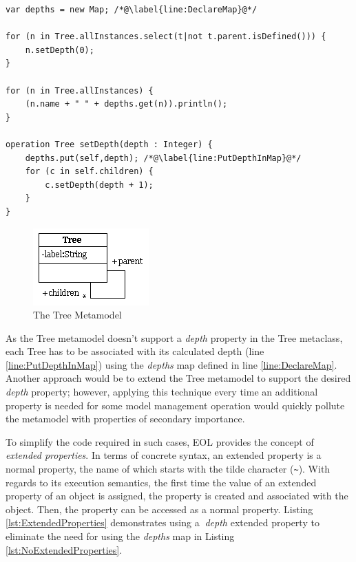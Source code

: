 \begin{lstlisting}[basicstyle=\ttfamily\footnotesize, flexiblecolumns=true, numbers=none, nolol=true, caption=Calculating and printing the depth of each Tree, label=lst:NoExtendedProperties, numbers=left, language=EOL, tabsize=2]
var depths = new Map; /*@\label{line:DeclareMap}@*/

for (n in Tree.allInstances.select(t|not t.parent.isDefined())) {
	n.setDepth(0);
}

for (n in Tree.allInstances) {
	(n.name + " " + depths.get(n)).println();
}

operation Tree setDepth(depth : Integer) {
	depths.put(self,depth); /*@\label{line:PutDepthInMap}@*/
	for (c in self.children) {
		c.setDepth(depth + 1);
	}
}
\end{lstlisting}

\begin{figure}[t!]
	\centering
		\includegraphics{images/metamodels/Tree.png}
	\caption{The Tree Metamodel}
	\label{fig:Tree1}
\end{figure}

As the Tree metamodel doesn't support a \emph{depth} property in the Tree metaclass, each Tree has to be associated with its calculated depth (line \ref{line:PutDepthInMap}) using the \emph{depths} map defined in line \ref{line:DeclareMap}. Another approach would be to extend the Tree metamodel to support the desired \emph{depth} property; however, applying this technique every time an additional property is needed for some model management operation would quickly pollute the metamodel with properties of secondary importance.

To simplify the code required in such cases, EOL provides the concept of \emph{extended properties}. In terms of concrete syntax, an extended property is a normal property, the name of which starts with the tilde character (\verb|~|). With regards to its execution semantics, the first time the value of an extended property of an object is assigned, the property is created and associated with the object. Then, the property can be accessed as a normal property. Listing \ref{lst:ExtendedProperties} demonstrates using a $~$\emph{depth} extended property to eliminate the need for using the \emph{depths} map in Listing \ref{lst:NoExtendedProperties}.

